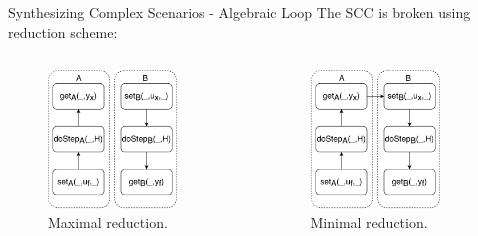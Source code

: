\documentclass{beamer}
\begin{document}
\begin{frame}{Synthesizing Complex Scenarios - Algebraic Loop}
    The SCC is broken using reduction scheme:
    \begin{columns}[T] 
        \begin{column}{.48\textwidth}
            \begin{figure}    
                \includegraphics[width=0.8\textwidth]{images/jacobian_reduced_graph.pdf}
                \caption{Maximal reduction.}
            \end{figure}  
        \end{column}
    \hfill%
    \begin{column}{.48\textwidth}
        \begin{figure}    
            \centering
            \includegraphics[width=0.8\textwidth]{images/gauss_reduced_graph.pdf}
            \caption{Minimal reduction.}
        \end{figure}
    \end{column}
    \end{columns}
\end{frame}
\end{document}
